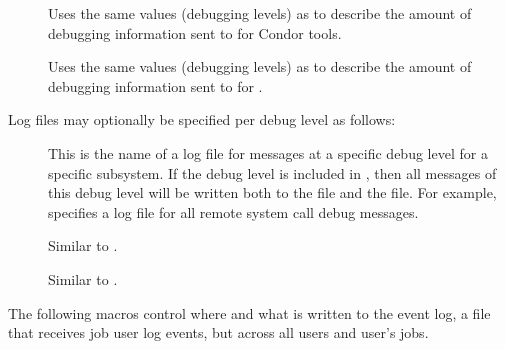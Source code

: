 \begin{description}
\item[] \label{param:ToolDebug} Uses the same
  values (debugging levels) as  to
  describe the amount of debugging information sent to  
  for Condor tools.

\item[] \label{param:SubmitDebug} Uses the same
  values (debugging levels) as  to
  describe the amount of debugging information sent to  
  for .

\end{description}

Log files may optionally be specified per debug level as follows:
\begin{description}

\item[] \label{param:SubsysLevelLog}
  This is
  the name of a log file for messages at a specific debug level for a
  specific subsystem.  If the debug level is included in
  , then all messages of this debug level will be
  written both to the  file and the
   file.  For example,
   specifies a log file for all remote
  system call debug messages.

\item[] \label{param:MaxSubsysLevelLog}
  Similar to .

\item[]
  \label{param:TruncSubsysLevelLogOnOpen} Similar to
  .

\end{description}

The following macros control where and what is written to the 
event log,
a file that receives job user log events, 
but across all users and user's jobs.

